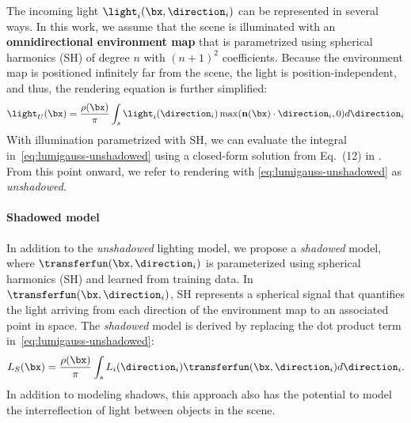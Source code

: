       The incoming light $\light_i(\bx, \direction_i)$ can be represented in
      several ways.
      In this work, we assume that the scene is illuminated with an
      \textbf{omnidirectional environment map} that is parametrized using
      spherical harmonics (SH) of degree $n$ with $(n{+}1)^2$ coefficients.
      Because the environment map is positioned infinitely far from the scene, the light is position-independent, and thus, the rendering equation is further simplified:
      \begin{equation}
        \label{eq:lumigauss-unshadowed}
        \light_{U}(\bx) = \frac{\rho(\bx)}{\pi} \int_{s} \light_i(\direction_i) \max(\mathbf{n}(\bx) \cdot \direction_i, 0) d\direction_i
      \end{equation}
      With illumination parametrized with SH, we can evaluate the integral
      in~\cref{eq:lumigauss-unshadowed} using a closed-form solution from
      Eq.~(12) in \cite{ramamoorthi2001envmap}.
      From this point onward, we refer to rendering with
      \cref{eq:lumigauss-unshadowed} as \textit{unshadowed}.

    \paragraph{Shadowed model}
      In addition to the \textit{unshadowed} lighting model, we propose a
      \textit{shadowed} model, where $\transferfun(\bx, \direction_i)$ is
      parameterized using spherical harmonics (SH) and learned from training
      data.
      In $\transferfun(\bx, \direction_i)$, SH represents a spherical signal
      that quantifies the light arriving from each direction of the
      environment map to an associated point in space.
      The \textit{shadowed} model is derived by replacing the dot product term in~\cref{eq:lumigauss-unshadowed}:
      \begin{equation}
        \label{eq:lumigauss-shadowed}
        L_{S}(\bx) = \frac{\rho(\bx)}{\pi} \int_{s} L_i(\direction_i)
        \transferfun(\bx, \direction_i) d\direction_i.
      \end{equation}
      In addition to modeling shadows, this approach also has the potential to
      model the interreflection of light between objects in the scene.

